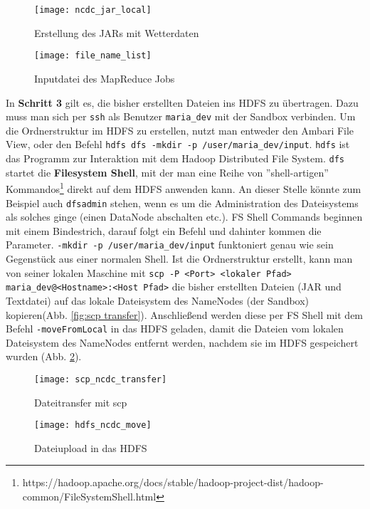 \begin{figure}[ht]
    \centering
    \texttt{[image: ncdc\_jar\_local]}
    \caption[Erstellung des JARs mit Wetterdaten]{Erstellung des JARs mit Wetterdaten}
    \label{fig:ncdc jar local}
    \texttt{[image: file\_name\_list]}
    \caption[Inputdatei des MapReduce Jobs]{Inputdatei des MapReduce Jobs}
    \label{fig:file names txt local}
\end{figure}


In \textbf{Schritt 3} gilt es, die bisher erstellten Dateien ins HDFS zu übertragen. Dazu muss man sich per \verb|ssh| als Benutzer \verb|maria_dev| mit der Sandbox verbinden. Um die Ordnerstruktur im HDFS zu erstellen, nutzt man entweder den Ambari File View, oder den Befehl \verb|hdfs dfs -mkdir -p /user/maria_dev/input|. \verb|hdfs| ist das Programm zur Interaktion mit dem Hadoop Distributed File System. \verb|dfs| startet die \textbf{Filesystem Shell}, mit der man eine Reihe von ''shell-artigen'' Kommandos\footnote{https://hadoop.apache.org/docs/stable/hadoop-project-dist/hadoop-common/FileSystemShell.html} direkt auf dem HDFS anwenden kann. An dieser Stelle könnte zum Beispiel auch \verb|dfsadmin| stehen, wenn es um die Administration des Dateisystems als solches ginge (einen DataNode abschalten etc.). FS Shell Commands beginnen mit einem Bindestrich, darauf folgt ein Befehl und dahinter kommen die Parameter. \verb|-mkdir -p /user/maria_dev/input| funktoniert genau wie sein Gegenstück aus einer normalen Shell. Ist die Ordnerstruktur erstellt, kann man von seiner lokalen Maschine mit \verb|scp -P <Port> <lokaler Pfad> maria_dev@<Hostname>:<Host Pfad>| die bisher erstellten Dateien (JAR und Textdatei) auf das lokale Dateisystem des NameNodes (der Sandbox) kopieren(Abb. \ref{fig:scp transfer}). Anschließend werden diese per FS Shell mit dem Befehl \verb|-moveFromLocal| in das HDFS geladen, damit die Dateien vom lokalen Dateisystem des NameNodes entfernt werden, nachdem sie im HDFS gespeichert wurden (Abb. \ref{fig:hdfs move}).

\begin{figure}[ht]
    \centering
    \texttt{[image: scp\_ncdc\_transfer]}
    \caption[Dateitransfer mit scp]{Dateitransfer mit scp}
    \label{fig:scp transfer}
    \texttt{[image: hdfs\_ncdc\_move]}
    \caption[Dateiupload in das HDFS]{Dateiupload in das HDFS}
    \label{fig:hdfs move}
\end{figure}

